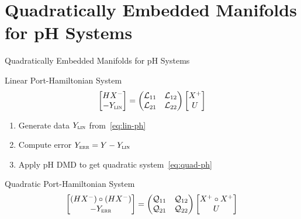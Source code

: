 \section{Quadratically Embedded Manifolds for pH Systems}

\begin{frame}{Quadratically Embedded Manifolds for pH Systems}
    \begin{block}{Linear Port-Hamiltonian System}
        \begin{equation}\label{eq:lin-ph}
            \begin{bmatrix}
                H X^- \\
                - Y_{\textsc{lin}}
            \end{bmatrix} = \begin{pmatrix}
                \mathcal{L}_{11} & \mathcal{L}_{12} \\
                \mathcal{L}_{21} & \mathcal{L}_{22}
            \end{pmatrix} \begin{bmatrix}
                X^+ \\
                U
            \end{bmatrix}
        \end{equation}
    \end{block}

    \begin{enumerate}
        \item Generate data $Y_{\textsc{lin}}$ from~\eqref{eq:lin-ph}
        \item Compute error $Y_{\textsc{err}} = Y - Y_{\textsc{lin}}$
        \item Apply pH DMD to get quadratic system~\eqref{eq:quad-ph}
    \end{enumerate}

    \begin{block}{Quadratic Port-Hamiltonian System}
        \begin{equation}\label{eq:quad-ph}
            \begin{bmatrix}
                (H X^-) \circ (H X^-) \\
                - Y_{\textsc{err}}
            \end{bmatrix} = \begin{pmatrix}
                \mathcal{Q}_{11} & \mathcal{Q}_{12} \\
                \mathcal{Q}_{21} & \mathcal{Q}_{22}
            \end{pmatrix} \begin{bmatrix}
                X^+ \circ X^+ \\
                U
            \end{bmatrix}
        \end{equation}
    \end{block}
\end{frame}

